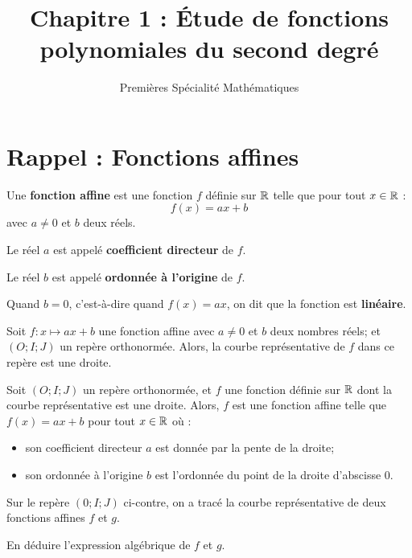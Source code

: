 \documentclass{poly}
\title{Chapitre 1 : Étude de fonctions polynomiales du second degré}
\date{}
\author{Premières Spécialité Mathématiques}
\begin{document}
\maketitle
\section{Rappel : Fonctions affines}
\begin{definition}
Une \textbf{fonction affine} est une fonction $f$ définie sur $\mathbb{R}$ telle que pour tout $x \in \mathbb{R}$ :
\begin{equation*}
f(x) = ax + b
\end{equation*}
avec $a \neq 0$ et $b$ deux réels.

Le réel $a$ est appelé \textbf{coefficient directeur} de $f$.

Le réel $b$ est appelé \textbf{ordonnée à l'origine} de $f$.
\end{definition}
\begin{remark}
Quand $b = 0$, c'est-à-dire quand $f(x) = ax$, on dit que la fonction est \textbf{linéaire}.
\end{remark}
\begin{proposition}
Soit $f : x \mapsto ax + b$ une fonction affine avec $a \neq 0$ et $b$ deux nombres réels; et $(O;I;J)$ un repère orthonormée. Alors, la courbe représentative de $f$ dans ce repère est une droite.
\end{proposition}
\begin{proposition}
Soit $(O;I;J)$ un repère orthonormée, et $f$ une fonction définie sur $\mathbb{R}$ dont la courbe représentative est une droite. Alors, $f$ est une fonction affine telle que $f(x) = ax + b$ pour tout $x \in \mathbb{R}$ où :
\begin{itemize}
\item son coefficient directeur $a$ est donnée par la pente de la droite;
\item son ordonnée à l'origine $b$ est l'ordonnée du point de la droite d'abscisse $0$.
\end{itemize}
\end{proposition}
\newpage
\begin{exercize}
\label{ex:affine}
Sur le repère $(0;I;J)$ ci-contre, on a tracé la courbe représentative de deux fonctions affines $f$ et $g$.
\begin{center}
\end{center}
En déduire l'expression algébrique de $f$ et $g$.
\end{exercize}
\end{document}

